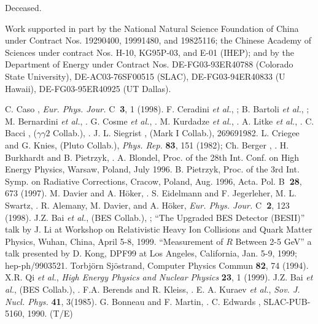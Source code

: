 \vspace*{-0.7cm}
\begin{references}

 Deceased.

 Work supported in part by the National Natural
 Science Foundation of China under Contract Nos. 19290400, 19991480, and
 19825116; the Chinese
 Academy of Sciences under contract Nos. H-10, KG95P-03, and E-01 (IHEP);
 and by the Department of
 Energy under Contract Nos.
 DE-FG03-93ER40788 (Colorado State University),
 DE-AC03-76SF00515 (SLAC), 
 DE-FG03-94ER40833 (U Hawaii), DE-FG03-95ER40925 (UT Dallas).

 C. Caso \etal, {\em Eur. Phys. Jour.} C{\bf~3}, 1 (1998).
 F. Ceradini {\it et al.}, ;
            B. Bartoli {\it et al.}, ;
            M. Bernardini {\it et al.}, .
 G. Cosme {\it et al.}, .
 M. Kurdadze {\it et al.}, .
 A. Litke {\it et al.}, .
 C. Bacci \etal, ($\gamma \gamma2$ Collab.),
.
 J. L. Siegrist \etal, (Mark I Collab.), \Journal
{\PLB}{26}{969}{1982}.
 L. Criegee and G. Knies, (Pluto Collab.),
{\em Phys. Rep.} {\bf 83}, 151 (1982);
Ch. Berger \etal, .
 H. Burkhardt and B. Pietrzyk, .
 A. Blondel, Proc. of the 28th Int. Conf. on High Energy
Physics, Warsaw, Poland, July 1996.
 B. Pietrzyk, Proc. of the 3rd Int. Symp. on Radiative
Corrections, Cracow, Poland, Aug. 1996, Acta. Pol. B{\bf~28}, 673 (1997).
 M. Davier and A. H\"{o}ker, .
 S. Eidelmann and F. Jegerleher,
 M. L. Swartz,  .
 R. Alemany, M. Davier, and A. H\"{o}ker, {\em Eur. Phys. Jour.}
C{\bf~2}, 123 (1998).
J.Z. Bai {\it et al.}, (BES Collab.),
;
``The Upgraded BES Detector (BESII)'' talk by J. Li at
Workshop on Relativistic Heavy Ion Collisions and Quark Matter
Physics, Wuhan, China, April 5-8, 1999.
 ``Measurement of $R$ Between 2-5 GeV'' a talk
presented by D. Kong, DPF99 at Los Angeles, California, Jan. 5-9, 1999;
hep-ph/9903521. 
Torbj\"{o}rn Sj\"{o}strand, Computer Physics Commun {\bf 82},
74 (1994).
X.R. Qi {\it et al.}, {\em High Energy 
Physics and Nuclear Physics} {\bf 23}, 1 (1999).
J.Z. Bai {\it et al.}, (BES Collab.), .
F.A. Berends and R. Kleiss, .
E. A. Kuraev {\it et al.}, {\em Sov. J. Nucl. Phys.} {\bf
41}, 3(1985). 
G. Bonneau and F. Martin, .
C. Edwards \etal, SLAC-PUB-5160, 1990. (T/E)

\end{references}













